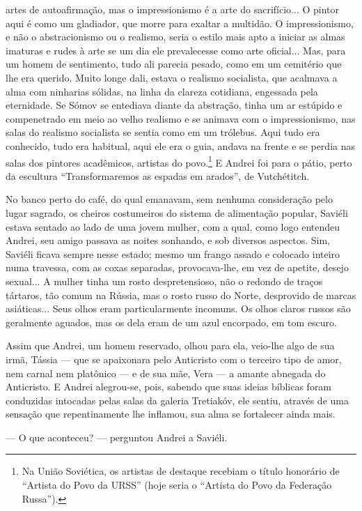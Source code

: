 artes de autoafirmação, mas o impressionismo é a arte do sacrifício... O
pintor aqui é como um gladiador, que morre para exaltar a multidão. O
impressionismo, e não o abstracionismo ou o realismo, seria o estilo
mais apto a iniciar as almas imaturas e rudes à arte se um dia ele
prevalecesse como arte oficial... Mas, para um homem de sentimento, tudo
ali parecia pesado, como em um cemitério que lhe era querido. Muito
longe dali, estava o realismo socialista, que acalmava a alma com
ninharias sólidas, na linha da clareza cotidiana, engessada pela
eternidade. Se Sómov se entediava diante da abstração, tinha um ar
estúpido e compenetrado em meio ao velho realismo e se animava com o
impressionismo, nas salas do realismo socialista se sentia como em um
trólebus. Aqui tudo era conhecido, tudo era habitual, aqui ele era o
guia, andava na frente e se perdia nas salas dos pintores acadêmicos,
artistas do povo.\footnote{Na União Soviética, os artistas de destaque
  recebiam o título honorário de ``Artista do Povo da URSS'' (hoje seria
  o ``Artista do Povo da Federação Russa'').} E Andrei foi para o pátio,
perto da escultura ``Transformaremos as espadas em arados'', de
Vutchétitch.

No banco perto do café, do qual emanavam, sem nenhuma consideração pelo
lugar sagrado, os cheiros costumeiros do sistema de alimentação popular,
Saviéli estava sentado ao lado de uma jovem mulher, com a qual, como
logo entendeu Andrei, seu amigo passava as noites sonhando, e sob
diversos aspectos. Sim, Saviéli ficava sempre nesse estado; mesmo um
frango assado e colocado inteiro numa travessa, com as coxas separadas,
provocava-lhe, em vez de apetite, desejo sexual... A mulher tinha um
rosto despretensioso, não o redondo de traços tártaros, tão comum na
Rússia, mas o rosto russo do Norte, desprovido de marcas asiáticas...
Seus olhos eram particularmente incomuns. Os olhos claros russos são
geralmente aguados, mas os dela eram de um azul encorpado, em tom
escuro.

Assim que Andrei, um homem reservado, olhou para ela, veio-lhe algo de
sua irmã, Tássia --- que se apaixonara pelo Anticristo com o terceiro
tipo de amor, nem carnal nem platônico --- e de sua mãe, Vera --- a
amante abnegada do Anticristo. E Andrei alegrou-se, pois, sabendo que
suas ideias bíblicas foram conduzidas intocadas pelas salas da galeria
Tretiakóv, ele sentiu, através de uma sensação que repentinamente lhe
inflamou, sua alma se fortalecer ainda mais.

--- O que aconteceu? --- perguntou Andrei a Saviéli.

